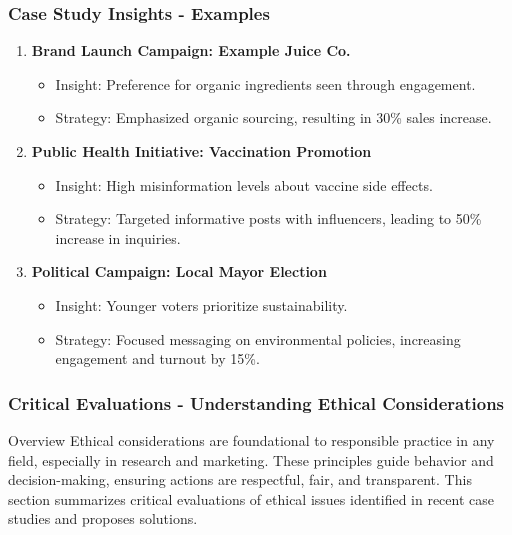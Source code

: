 \documentclass{beamer}
\begin{document}
\begin{frame}[fragile]
    \frametitle{Case Study Insights - Examples}
    \begin{enumerate}
        \item \textbf{Brand Launch Campaign: Example Juice Co.}
        \begin{itemize}
            \item Insight: Preference for organic ingredients seen through engagement.
            \item Strategy: Emphasized organic sourcing, resulting in 30\% sales increase.
        \end{itemize}
        
        \item \textbf{Public Health Initiative: Vaccination Promotion}
        \begin{itemize}
            \item Insight: High misinformation levels about vaccine side effects.
            \item Strategy: Targeted informative posts with influencers, leading to 50\% increase in inquiries.
        \end{itemize}
        
        \item \textbf{Political Campaign: Local Mayor Election}
        \begin{itemize}
            \item Insight: Younger voters prioritize sustainability.
            \item Strategy: Focused messaging on environmental policies, increasing engagement and turnout by 15\%.
        \end{itemize}
    \end{enumerate}
\end{frame}

\begin{frame}[fragile]
    \frametitle{Critical Evaluations - Understanding Ethical Considerations}
    \begin{block}{Overview}
        Ethical considerations are foundational to responsible practice in any field, especially in research and marketing. These principles guide behavior and decision-making, ensuring actions are respectful, fair, and transparent. This section summarizes critical evaluations of ethical issues identified in recent case studies and proposes solutions.
    \end{block}
\end{frame}
\end{document}
